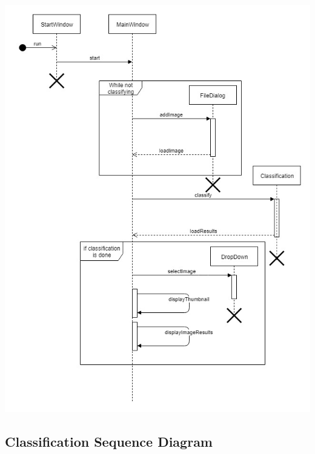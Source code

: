 \documentclass[parskip=full]{scrartcl}
\begin{document}
\begin{center}
\includegraphics[width=1.0\textwidth]{ViewResults.jpg}
\end{center}

\pagebreak

\subsection {Classification Sequence Diagram}
\end{document}
